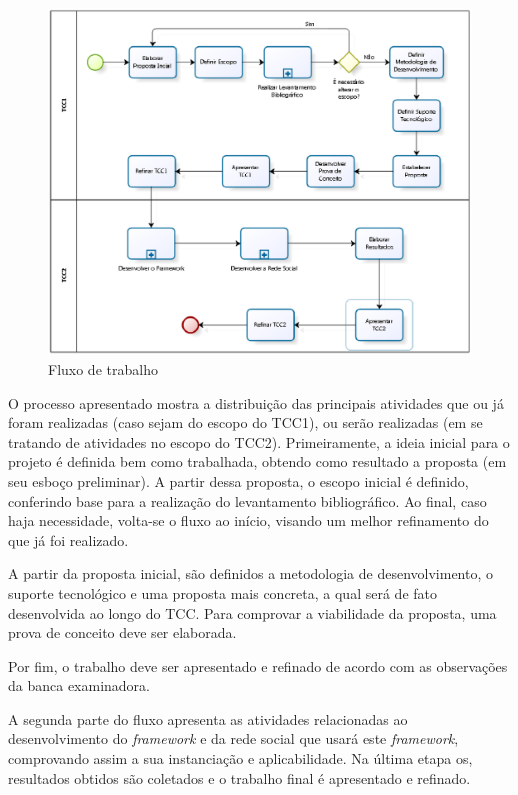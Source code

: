 \begin{figure}[h]
	\centering
	\includegraphics[scale=0.6]{figuras/capitulo4/processo_tcc.eps}
	\caption{Fluxo de trabalho}
	\label{processo tcc}
\end{figure}

O processo apresentado mostra a distribuição das principais atividades que ou já foram realizadas (caso sejam do escopo do TCC1), ou serão realizadas (em se tratando de atividades no escopo do TCC2). Primeiramente, a ideia inicial para o projeto é definida bem como trabalhada, obtendo como resultado a proposta (em seu esboço preliminar). A partir dessa proposta, o escopo inicial é definido, conferindo base para a realização do levantamento bibliográfico. Ao final, caso haja necessidade, volta-se o fluxo ao início, visando um melhor refinamento do que já foi realizado.

A partir da proposta inicial, são definidos a metodologia de desenvolvimento, o suporte tecnológico e uma proposta mais concreta, a qual será de fato desenvolvida ao longo do TCC. Para comprovar a viabilidade da proposta, uma prova de conceito deve ser elaborada.

Por fim, o trabalho deve ser apresentado e refinado de acordo com as observações da banca examinadora.

A segunda parte do fluxo apresenta as atividades relacionadas ao desenvolvimento do \textit{framework} e da rede social que usará este \textit{framework}, comprovando assim a sua instanciação e aplicabilidade. Na última etapa os, resultados obtidos são coletados e o trabalho final é apresentado e refinado.


